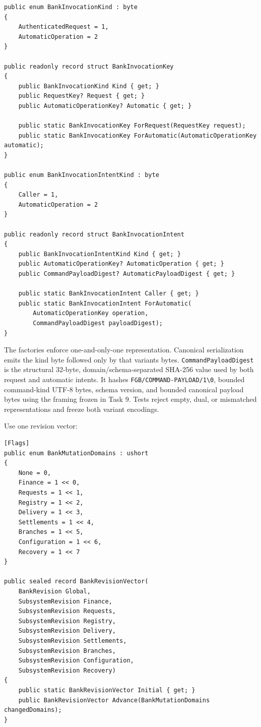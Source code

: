 \documentclass[
  10pt,
  letterpaper,
]{article}
\newcommand{\passthrough}[1]{#1}
\begin{document}
\begin{lstlisting}
public enum BankInvocationKind : byte
{
    AuthenticatedRequest = 1,
    AutomaticOperation = 2
}

public readonly record struct BankInvocationKey
{
    public BankInvocationKind Kind { get; }
    public RequestKey? Request { get; }
    public AutomaticOperationKey? Automatic { get; }

    public static BankInvocationKey ForRequest(RequestKey request);
    public static BankInvocationKey ForAutomatic(AutomaticOperationKey automatic);
}

public enum BankInvocationIntentKind : byte
{
    Caller = 1,
    AutomaticOperation = 2
}

public readonly record struct BankInvocationIntent
{
    public BankInvocationIntentKind Kind { get; }
    public AutomaticOperationKey? AutomaticOperation { get; }
    public CommandPayloadDigest? AutomaticPayloadDigest { get; }

    public static BankInvocationIntent Caller { get; }
    public static BankInvocationIntent ForAutomatic(
        AutomaticOperationKey operation,
        CommandPayloadDigest payloadDigest);
}
\end{lstlisting}

The factories enforce one-and-only-one representation. Canonical
serialization emits the kind byte followed only by that
variant\textquotesingle s bytes.
\passthrough{\lstinline!CommandPayloadDigest!} is the structural
32-byte, domain/schema-separated SHA-256 value used by both request and
automatic intents. It hashes
\texttt{FGB/}\allowbreak{}\texttt{COMMAND-}\allowbreak{}\texttt{PAYLOAD/}\allowbreak{}\texttt{1\textbackslash{}}\allowbreak{}\texttt{0},
bounded command-kind UTF-8 bytes, schema version, and bounded canonical
payload bytes using the framing frozen in Task 9. Tests reject empty,
dual, or mismatched representations and freeze both variant encodings.

Use one revision vector:

\begin{lstlisting}
[Flags]
public enum BankMutationDomains : ushort
{
    None = 0,
    Finance = 1 << 0,
    Requests = 1 << 1,
    Registry = 1 << 2,
    Delivery = 1 << 3,
    Settlements = 1 << 4,
    Branches = 1 << 5,
    Configuration = 1 << 6,
    Recovery = 1 << 7
}

public sealed record BankRevisionVector(
    BankRevision Global,
    SubsystemRevision Finance,
    SubsystemRevision Requests,
    SubsystemRevision Registry,
    SubsystemRevision Delivery,
    SubsystemRevision Settlements,
    SubsystemRevision Branches,
    SubsystemRevision Configuration,
    SubsystemRevision Recovery)
{
    public static BankRevisionVector Initial { get; }
    public BankRevisionVector Advance(BankMutationDomains changedDomains);
}
\end{lstlisting}
\end{document}
